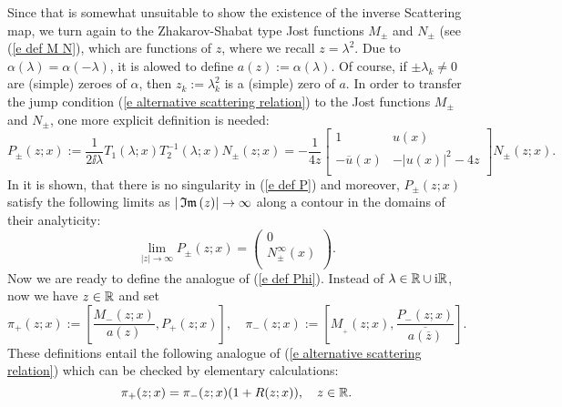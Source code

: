 Since that \rh is somewhat unsuitable to show the existence of the inverse Scattering map, we turn again to the Zhakarov-Shabat type Jost functions $M_{\pm}$ and $N_{\pm}$ (see (\ref{e def M N}), which are functions of $z$, where we recall $z=\lambda^2$. Due to $\alpha(\lambda)=\alpha(-\lambda)$, it is alowed to define $a(z):=\alpha(\lambda)$. Of course, if $\pm\lambda_k\neq0$ are (simple) zeroes of $\alpha$, then $z_k:=\lambda_k^2$ is a (simple) zero of $a$. In order to transfer the jump condition (\ref{e alternative scattering relation}) to the Jost functions $M_{\pm}$ and $N_{\pm}$, one more explicit definition is needed:
\begin{equation}\label{e def P}
    P_{\pm}(z;x):=\frac{1}{2\ii\lambda}
    T_1(\lambda;x)T_2^{-1}(\lambda;x)N_{\pm}(z;x)=
    -\frac{1}{4z}
    \left[
      \begin{array}{cc}
        1 & u(x) \\
        -\overline{u}(x) & -|u(x)|^2-4z \\
      \end{array}
    \right]N_{\pm}(z;x).
\end{equation}
In \cite[Lemma 5]{Pelinovsky2016} it is shown, that there is no singularity in (\ref{e def P}) and moreover, $P_{\pm}(z;x)$ satisfy the following limits as $|\,\mathfrak{Im}\,(z)|\to\infty$ along a contour in the domains of their analyticity:
\begin{equation*}
    \lim_{|z|\to\infty}P_{\pm}(z;x)=
    \left(
      \begin{array}{c}
        0\\
        N_{\pm}^{\infty}(x) \\
      \end{array}
    \right).
\end{equation*}
Now we are ready to define the analogue of (\ref{e def Phi}). Instead of $\lambda\in\mathbb R\cup\mathrm{i}\mathbb R$, now we have $z\in\mathbb R$ and set
\begin{equation}\label{e def pi}
    \pi_+(z;x):=
    \left[\frac{M_{-}(z;x)} {a(z)},P_{+}(z;x)
    \right],\quad
    \pi_-(z;x):=
    \left[M_{_+}(z;x) ,\frac{P_{-}(z;x)} {\overline{a(\overline{z})}}
    \right].
\end{equation}
These definitions entail the following analogue of (\ref{e alternative scattering relation}) which can be checked by elementary calculations:
\begin{equation}\label{e jump of pi}
    \pi_+(z;x)=\pi_-(z;x)(1+R(z;x)), \quad z\in\mathbb R.
\end{equation}
